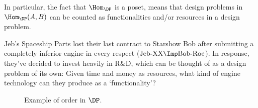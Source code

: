 In particular, the fact that $\Hom_\DP$ is a poset, means that design problems in $\Hom_\DP(A,B)$ can be counted as functionalities and/or resources in a design problem.

\begin{example}\label{ex:r&d}
Jeb's Spaceship Parts lost their last contract to Starshow Bob after submitting a completely inferior engine in every respect ($\text{Jeb-XX} \Imp \text{Bob-Roc}$). In response, they've decided to invest heavily in R\&D, which can be thought of as a design problem of its own: Given time and money as resources, what kind of engine technology can they produce as a `functionality'?

\begin{figure}[h!]
\begin{center}
\end{center}
\caption{Example of order in $\DP$. \label{fig:orderdp}}
\end{figure}
\end{example}